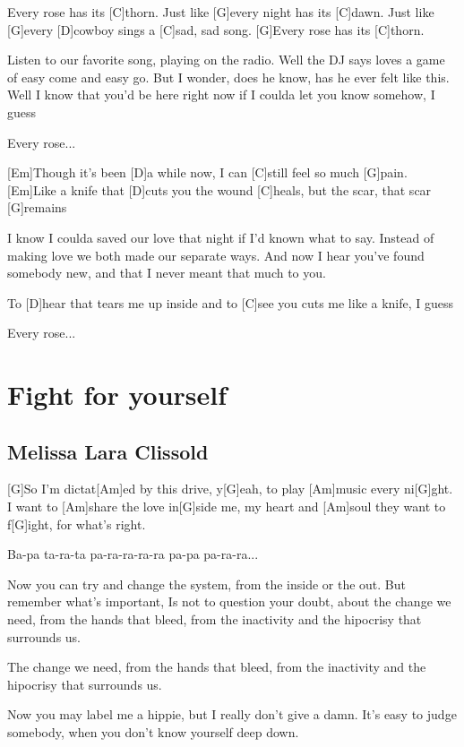 \documentclass[a4paper,12pt]{article}
\begin{document}
\begin{multicols}{2}
\begin{guitar}
[G]Every rose has its [C]thorn.
Just like [G]every night has its [C]dawn.
Just like [G]every [D]cowboy sings a [C]sad, sad song.
[G]Every rose has its [C]thorn.


Listen to our favorite song,
playing on the radio.
Well the DJ says loves a game of 
easy come and easy go.
But I wonder, does he know,
has he ever felt like this.
Well I know that you'd be here right now 
if I
coulda let you know somehow, I guess


Every rose...


[Em]Though it's been [D]a while now, 
I can [C]still feel so much [G]pain.
[Em]Like a knife that [D]cuts you
the wound [C]heals, 
but the scar, that scar [G]remains


I know I coulda saved our love 
that night if I'd known what to say.
Instead of making love 
we both made our separate ways.
And now I hear you've found somebody new, 
and that I never meant that much to you.


To [D]hear that tears me up inside 
and to [C]see you cuts me like a knife, I guess


Every rose...

\end{guitar}
\section{Fight for yourself}
\subsection*{Melissa Lara Clissold}
\begin{guitar}
[Am      G      Am]

[G]So I'm dictat[Am]ed by this drive, y[G]eah,
to play [Am]music every ni[G]ght.
I want to [Am]share the love in[G]side me,
my heart and [Am]soul they want to f[G]ight,
for what's right.


Ba-pa ta-ra-ta pa-ra-ra-ra-ra
pa-pa pa-ra-ra...


Now you can try and change the system,
from the inside or the out.
But remember what's important,
Is not to question your doubt,
about the change we need,
from the hands that bleed,
from the inactivity
and the hipocrisy that surrounds us.


The change we need,
from the hands that bleed,
from the inactivity
and the hipocrisy that surrounds us.


Now you may label me a hippie,
but I really don't give a damn.
It's easy to judge somebody,
when you don't know yourself deep down.



\end{guitar}
\end{multicols}
\end{document}

